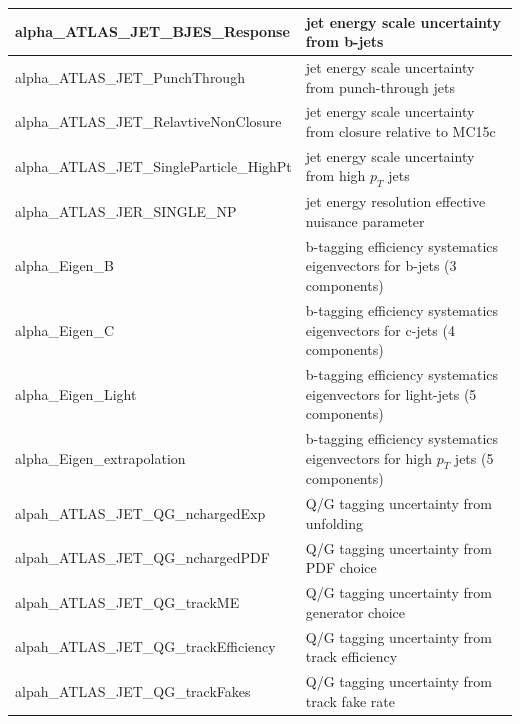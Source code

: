 \begin{table}[]
{\begin{tabular}{|l|l|}
alpha\_ATLAS\_JET\_BJES\_Response         & jet energy scale uncertainty from b-jets                                                             \\ \hline
alpha\_ATLAS\_JET\_PunchThrough           & jet energy scale uncertainty from punch-through jets                                                 \\ \hline
alpha\_ATLAS\_JET\_RelavtiveNonClosure    & jet energy scale uncertainty from closure relative to MC15c                                          \\ \hline
alpha\_ATLAS\_JET\_SingleParticle\_HighPt & jet energy scale uncertainty from high $p_T$ jets                                                    \\ \hline
alpha\_ATLAS\_JER\_SINGLE\_NP             & jet energy resolution effective nuisance parameter                                                   \\ \hline
alpha\_Eigen\_B                           & b-tagging efficiency systematics eigenvectors for b-jets (3 components)                              \\ \hline
alpha\_Eigen\_C                           & b-tagging efficiency systematics eigenvectors for c-jets (4 components)                              \\ \hline
alpha\_Eigen\_Light                       & b-tagging efficiency systematics eigenvectors for light-jets (5 components)                          \\ \hline
alpha\_Eigen\_extrapolation               & b-tagging efficiency systematics eigenvectors for high $p_T$ jets (5 components)                     \\ \hline
alpah\_ATLAS\_JET\_QG\_nchargedExp        & Q/G tagging uncertainty from unfolding                                                               \\ \hline
alpah\_ATLAS\_JET\_QG\_nchargedPDF        & Q/G tagging uncertainty from PDF choice                                                              \\ \hline
alpah\_ATLAS\_JET\_QG\_trackME            & Q/G tagging uncertainty from generator choice                                                        \\ \hline
alpah\_ATLAS\_JET\_QG\_trackEfficiency    & Q/G tagging uncertainty from track efficiency                                                        \\ \hline
alpah\_ATLAS\_JET\_QG\_trackFakes         & Q/G tagging uncertainty from track fake rate                                                         \\ \hline

\end{tabular}}
\end{table}
